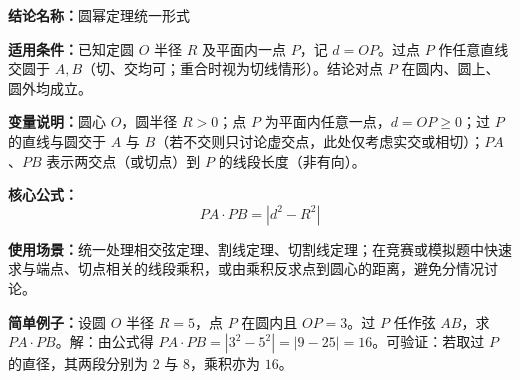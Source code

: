 \textbf{结论名称：}圆幂定理统一形式

\textbf{适用条件：}已知定圆 \(O\) 半径 \(R\) 及平面内一点 \(P\)，记 \(d = OP\)。过点 \(P\) 作任意直线交圆于 \(A, B\)（切、交均可；重合时视为切线情形）。结论对点 \(P\) 在圆内、圆上、圆外均成立。

\textbf{变量说明：}圆心 \(O\)，圆半径 \(R > 0\)；点 \(P\) 为平面内任意一点，\(d = OP \geq 0\)；过 \(P\) 的直线与圆交于 \(A\) 与 \(B\)（若不交则只讨论虚交点，此处仅考虑实交或相切）；\(PA\)、\(PB\) 表示两交点（或切点）到 \(P\) 的线段长度（非有向）。

\textbf{核心公式：}
\[
\boxed{PA \cdot PB = |d^{2} - R^{2}|}
\]

\textbf{使用场景：}统一处理相交弦定理、割线定理、切割线定理；在竞赛或模拟题中快速求与端点、切点相关的线段乘积，或由乘积反求点到圆心的距离，避免分情况讨论。

\textbf{简单例子：}设圆 \(O\) 半径 \(R=5\)，点 \(P\) 在圆内且 \(OP=3\)。过 \(P\) 任作弦 \(AB\)，求 \(PA \cdot PB\)。解：由公式得 \(PA \cdot PB = |3^{2} - 5^{2}| = |9 - 25| = 16\)。可验证：若取过 \(P\) 的直径，其两段分别为 \(2\) 与 \(8\)，乘积亦为 \(16\)。